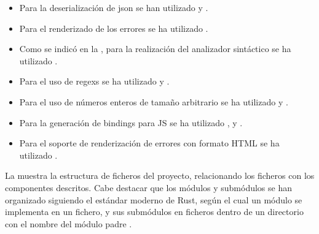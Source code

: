\begin{itemize}
    \item Para la deserialización de \gls{json} se han utilizado 
    y .
    \item Para el renderizado de los errores se ha utilizado .
    \item Como se indicó en la , para la realización del
    analizador sintáctico se ha utilizado .
    \item Para el uso de \glspl{regex} se ha utilizado  y
    .
    \item Para el uso de números enteros de tamaño arbitrario se ha utilizado
     y .
    \item Para la generación de \glspl{binding} para \gls{JS} se ha utilizado
    , y .
    \item Para el soporte de renderización de errores con formato HTML se ha
    utilizado .
\end{itemize}

La  muestra la estructura de ficheros del proyecto,
relacionando los ficheros con los componentes descritos. Cabe destacar que los
módulos y submódulos se han organizado siguiendo el estándar moderno de Rust,
según el cual un módulo se implementa en un fichero, y sus submódulos en ficheros
dentro de un directorio con el nombre del módulo padre \parencite{Rust}.

\newcommand{\componentref}[1]{\hyperref[req:#1]{#1}}

